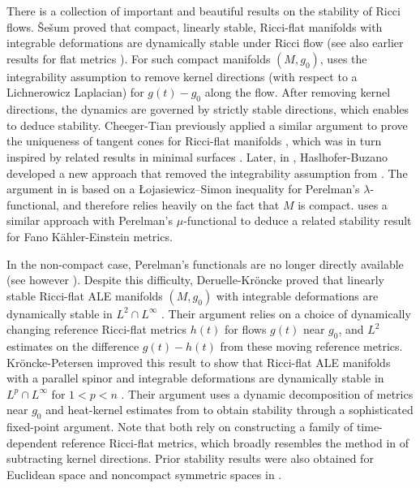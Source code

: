 \documentclass[12pt]{amsart}
\renewcommand{\1}{{\mathbf 1}}
\theoremstyle{others}
\numberwithin{equation}{section}
\begin{document}
There is a collection of important and beautiful results on the stability of Ricci flows.
{\v S}e{\v s}um proved that compact, linearly stable, Ricci-flat manifolds with integrable deformations are dynamically stable under Ricci flow \cite{Sesum06} (see also earlier results for flat metrics \cite{GIK02}).
For such compact manifolds $(M, g_0)$, \cite{Sesum06} uses the integrability assumption to remove kernel directions (with respect to a Lichnerowicz Laplacian) for $g(t) - g_0$ along the flow.
After removing kernel directions, the dynamics are governed by strictly stable directions, which enables \cite{Sesum06} to deduce stability.
Cheeger-Tian previously applied a similar argument to prove the uniqueness of tangent cones for Ricci-flat manifolds \cite{CheegerTian94}, which was in turn inspired by related results in minimal surfaces \cite{AllardAlmgren81, Simon83}.
Later, in \cite{HM14}, Haslhofer-Buzano developed a new approach that removed the integrability assumption from \cite{Sesum06}.
The argument in \cite{HM14} is based on a \L ojasiewicz–Simon inequality for Perelman's $\lambda$-functional, and therefore relies heavily on the fact that $M$ is compact.
\cite{SunWang15} uses a similar approach with Perelman's $\mu$-functional to deduce a related stability result for Fano K{\"a}hler-Einstein metrics.

In the non-compact case, Perelman's functionals are no longer directly available (see however \cite{DeruelleOzuch20, DeruelleOzuch21}).
Despite this difficulty, Deruelle-Kr{\" o}ncke proved that linearly stable Ricci-flat ALE manifolds $(M,g_0)$ with integrable deformations are dynamically stable in $L^2 \cap L^\infty$ \cite{DeruelleKroncke20}.
Their argument relies on a choice of dynamically changing reference Ricci-flat metrics $h(t)$ for flows $g(t)$ near $g_0$, and $L^2$ estimates on the difference $g(t) - h(t)$ from these moving reference metrics.
Kr{\" o}ncke-Petersen improved this result to show that %
Ricci-flat ALE manifolds with a parallel spinor and integrable deformations are dynamically stable in $L^p \cap L^\infty$ for $1 < p < n$ \cite{KronckePetersen20}.
Their argument uses a dynamic decomposition of metrics near $g_0$ and heat-kernel estimates from \cite{KronckePetersen22} to obtain stability through a sophisticated fixed-point argument.
Note that both \cite{DeruelleKroncke20, KronckePetersen20} rely on constructing a family of time-dependent reference Ricci-flat metrics, which broadly resembles the method in \cite{Sesum06} of subtracting kernel directions.
Prior stability results were also obtained for Euclidean space and noncompact symmetric spaces in \cite{SSS08, Bamler15}.
\end{document}
